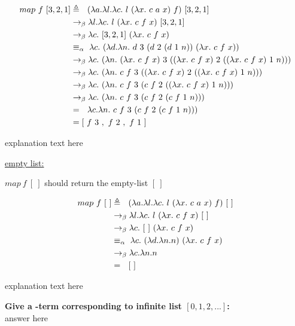 \documentclass{article}
\begin{document}
\begin{Large}
		\begin{align*}
			map \ f \ [3,2,1] &\triangleq \saq (\la a.\la l.\la c. \ l \ (\la x.\ c \ a \ x) \ f) \ [3,2,1] \\
			&\equals \la l.\la c. \ l \ (\la x.\ c \ f \ x) \ [3,2,1] \\
			&\equals \la c. \ [3,2,1] \ (\la x.\ c \ f \ x) \\
			&\equiv_\alpha \, \, \la c. \  (\la d.\la n. \ d \ 3 \ (d \ 2 \ (d \ 1 \ n)) \ (\la x.\ c \ f \ x)) \\
			&\equals \la c. \  (\la n. \ (\la x.\ c \ f \ x) \ 3 \ ((\la x.\ c \ f \ x) \ 2 \ ((\la x.\ c \ f \ x) \ 1 \ n))) \\
			&\equals \la c. \  (\la n. \ c\ f \ 3 \ ((\la x.\ c \ f \ x) \ 2 \ ((\la x.\ c \ f \ x) \ 1 \ n))) \\
			&\equals \la c. \  (\la n. \ c\ f \ 3 \ (c \ f \ 2 \ ((\la x.\ c \ f \ x) \ 1 \ n))) \\
			&\equals \la c. \  (\la n. \ c\ f \ 3 \ (c \ f \ 2 \ (c \ f \ 1 \ n))) \\
			&= \saq \la c.\la n. \ c\ f \ 3 \ (c \ f \ 2 \ (c \ f \ 1 \ n))) \\
			&= [\ f \ 3 \ , \ f \ 2 \ , \  f \ 1\ ]
		\end{align*}
		
		explanation text here
		\newline
		
		\underline{empty list:}
		\newline
		
		$map \ f \ [ \ ]$ should return the empty-list $[ \ ]$
		
		\begin{align*}
			map \ f \ [ \ ] &\triangleq \saq (\la a.\la l.\la c. \ l \ (\la x.\ c \ a \ x) \ f) \ [ \ ] \\
			&\equals \la l.\la c. \ l \ (\la x.\ c \ f \ x) \ [ \ ] \\
			&\equals \la c. \ [ \ ] \ (\la x.\ c \ f \ x) \\
			&\equiv_\alpha \, \, \la c. \ (\la d.\la n.n) \ (\la x.\ c \ f \ x) \\
			&\equals \la c.\la n.n \\
			&= \saq [ \ ]
		\end{align*}
		\newline
		
		explanation text here
		\newline
		
		
		\textbf{Give a \lamb -term corresponding to infinite list $[0,1,2,...]$:}\\
		
		answer here
	\end{Large}
	
\end{document}
